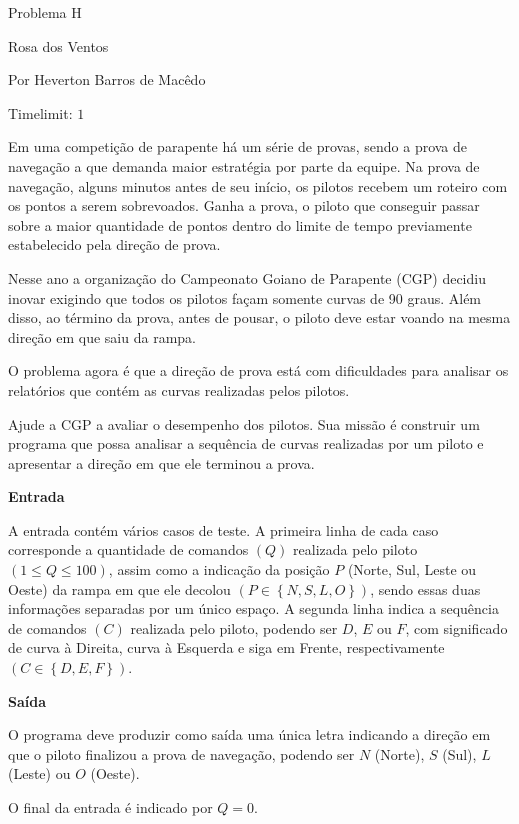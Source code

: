 \begin{center}
Problema H

Rosa dos Ventos

{\tiny Por Heverton Barros de Macêdo}

Timelimit: $1$	
\end{center}

Em uma competição de parapente há um série de provas, sendo a prova de navegação a que demanda maior estratégia por parte da equipe. Na prova de navegação, alguns minutos antes de seu início, os pilotos recebem um roteiro com os pontos a serem sobrevoados. Ganha a prova, o piloto que conseguir passar sobre a maior quantidade de pontos dentro do limite de tempo previamente estabelecido pela direção de prova.

Nesse ano a organização do Campeonato Goiano de Parapente (CGP) decidiu inovar exigindo que todos os pilotos façam somente curvas de 90 graus. Além disso, ao término da prova, antes de pousar, o piloto deve estar voando na mesma direção em que saiu da rampa.

O problema agora é que a direção de prova está com dificuldades para analisar os relatórios que contém as curvas realizadas pelos pilotos.

Ajude a CGP a avaliar o desempenho dos pilotos. Sua missão é construir um programa que possa analisar a sequência de curvas realizadas por um piloto e apresentar a direção em que ele terminou a prova.

\vspace{0.3cm}
\textbf{Entrada}

A entrada contém vários casos de teste. A primeira linha de cada caso corresponde a quantidade de comandos $(Q)$ realizada pelo piloto $(1 \leq Q \leq 100)$, assim como a indicação da posição $P$ (Norte, Sul, Leste ou Oeste) da rampa em que ele decolou $(P \in \left\{N, S, L, O\right\})$, sendo essas duas informações separadas por um único espaço. A segunda linha indica a sequência de comandos $(C)$ realizada pelo piloto, podendo ser $D$, $E$ ou $F$, com significado de curva à Direita, curva à Esquerda e siga em Frente, respectivamente $(C \in \left\{D, E, F\right\})$.

\vspace{0.3cm}
\textbf{Saída}

O programa deve produzir como saída uma única letra indicando a direção em que o piloto finalizou a prova de navegação, podendo ser $N$ (Norte), $S$ (Sul), $L$ (Leste) ou $O$ (Oeste).

O final da entrada é indicado por $Q = 0$.

